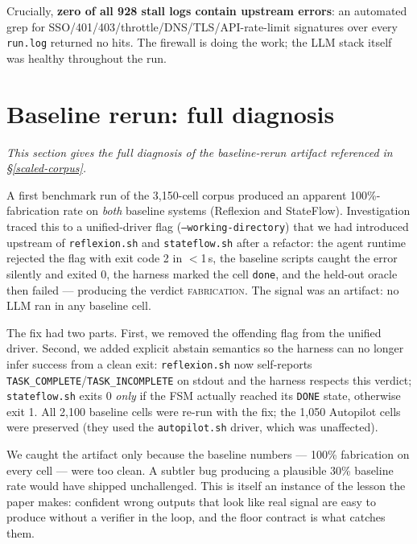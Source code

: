 Crucially, \textbf{zero of all 928 stall logs contain upstream errors}: an automated grep for
SSO/401/403/throttle/DNS/TLS/API-rate-limit signatures over every \texttt{run.log} returned no
hits. The firewall is doing the work; the LLM stack itself was healthy throughout the run.

\section{Baseline rerun: full diagnosis}\label{app:baseline-rerun}

\textit{This section gives the full diagnosis of the baseline-rerun artifact referenced in
\S\ref{scaled-corpus}.}

A first benchmark run of the 3{,}150-cell corpus produced an apparent 100\%-fabrication rate on
\emph{both} baseline systems (Reflexion and StateFlow). Investigation traced this to a
unified-driver flag (\texttt{--working-directory}) that we had introduced upstream of
\texttt{reflexion.sh} and \texttt{stateflow.sh} after a refactor: the agent runtime rejected the
flag with exit code 2 in $<$1\,s, the baseline scripts caught the error silently and exited 0, the
harness marked the cell \texttt{done}, and the held-out oracle then failed --- producing the
verdict \textsc{fabrication}. The signal was an artifact: no LLM ran in any baseline cell.

The fix had two parts. First, we removed the offending flag from the unified driver. Second, we
added explicit abstain semantics so the harness can no longer infer success from a clean exit:
\texttt{reflexion.sh} now self-reports \texttt{TASK\_COMPLETE}/\texttt{TASK\_INCOMPLETE} on stdout
and the harness respects this verdict; \texttt{stateflow.sh} exits 0 \emph{only} if the FSM
actually reached its \texttt{DONE} state, otherwise exit 1. All 2{,}100 baseline cells were re-run
with the fix; the 1{,}050 Autopilot cells were preserved (they used the \texttt{autopilot.sh}
driver, which was unaffected).

We caught the artifact only because the baseline numbers --- 100\% fabrication on every cell ---
were too clean. A subtler bug producing a plausible 30\% baseline rate would have shipped
unchallenged. This is itself an instance of the lesson the paper makes: confident wrong outputs
that look like real signal are easy to produce without a verifier in the loop, and the floor
contract is what catches them.

